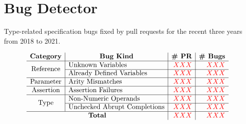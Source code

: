 \section{Bug Detector}\label{sec:checker}

\begin{table}
  \centering
  \caption{Type-related specification bugs fixed by pull requests for the recent
  three years from 2018 to 2021.}
  \label{table:pr-bugs}
  \vspace*{-1.5em}
  \[
    \small
    \begin{array}{c|l|r|r}
      \multicolumn{1}{c}{\textbf{Category}} &
      \multicolumn{1}{|c}{\textbf{Bug Kind}} &
      \multicolumn{1}{|c}{\textbf{\# PR}} &
      \multicolumn{1}{|c}{\textbf{\# Bugs}}\\
      \hline

      \multirow{2}{*}{\text{Reference}}
      & \text{Unknown Variables} & \inred{XXX} & \inred{XXX}\\\cline{2-4}
      & \text{Already Defined Variables} & \inred{XXX} & \inred{XXX}\\\hline

      \multirow{1}{*}{\text{Parameter}}
      & \text{Arity Mismatches} & \inred{XXX} & \inred{XXX}\\\hline

      \multirow{1}{*}{\text{Assertion}}
      & \text{Assertion Failures} & \inred{XXX} & \inred{XXX}\\\hline

      \multirow{2}{*}{\text{Type}}
      & \text{Non-Numeric Operands} & \inred{XXX} & \inred{XXX}\\\cline{2-4}
      & \text{Unchecked Abrupt Completions} & \inred{XXX} & \inred{XXX}\\\hline

      \multicolumn{2}{c|}{\textbf{Total}} & \inred{XXX} & \inred{XXX}\\

    \end{array}
  \]
  \vspace*{-1.5em}
\end{table}


